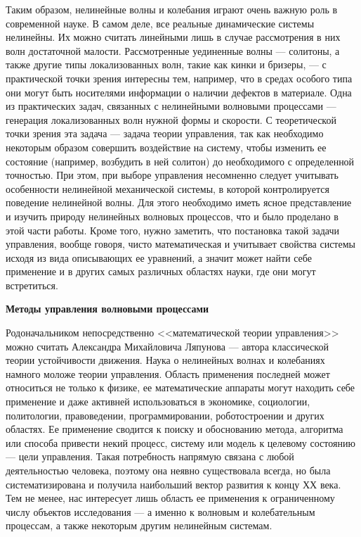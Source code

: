 Таким образом, нелинейные волны и колебания играют очень важную роль в современной науке. В самом деле, все реальные динамические системы нелинейны. Их можно считать линейными лишь в случае рассмотрения в них волн достаточной малости. Рассмотренные уединенные волны — солитоны, а также другие типы локализованных волн, такие как кинки и бризеры, --- с практической точки зрения интересны тем, например, что в средах особого типа они могут быть носителями информации о наличии дефектов в материале. Одна из практических задач, связанных с нелинейными волновыми процессами --- генерация локализованных волн нужной формы и скорости. С теоретической точки зрения эта задача — задача теории управления, так как необходимо некоторым образом совершить воздействие на систему, чтобы изменить ее состояние (например, возбудить в ней солитон) до необходимого с определенной точностью. При этом, при выборе управления несомненно следует учитывать особенности нелинейной механической системы, в которой контролируется поведение нелинейной волны. Для этого необходимо иметь ясное представление и изучить природу нелинейных волновых процессов, что и было проделано в этой части работы. Кроме того, нужно заметить, что постановка такой задачи управления, вообще говоря, чисто математическая и учитывает свойства системы исходя из вида описывающих ее уравнений, а значит может найти себе применение и в других самых различных областях науки, где они могут встретиться.

\textbf{Методы управления волновыми процессами}

Родоначальником непосредственно <<математической теории управления>> можно считать Александра Михайловича Ляпунова --- автора классической теории устойчивости движения. 
Наука о нелинейных волнах и колебаниях намного моложе теории управления. Область применения последней может относиться не только к физике, ее математические аппараты могут находить себе применение и даже активней использоваться в экономике, социологии, политологии, правоведении, программировании, роботостроении и других областях. Ее применение сводится к поиску и обоснованию метода, алгоритма или способа привести некий процесс, систему или модель к целевому состоянию --- цели управления. Такая потребность напрямую связана с любой деятельностью человека, поэтому она неявно существовала всегда, но была систематизирована и получила наибольший вектор развития к концу ХХ века. Тем не менее, нас интересует лишь область ее применения к ограниченному числу объектов исследования --- а именно к волновым и колебательным процессам, а также некоторым другим нелинейным системам.

